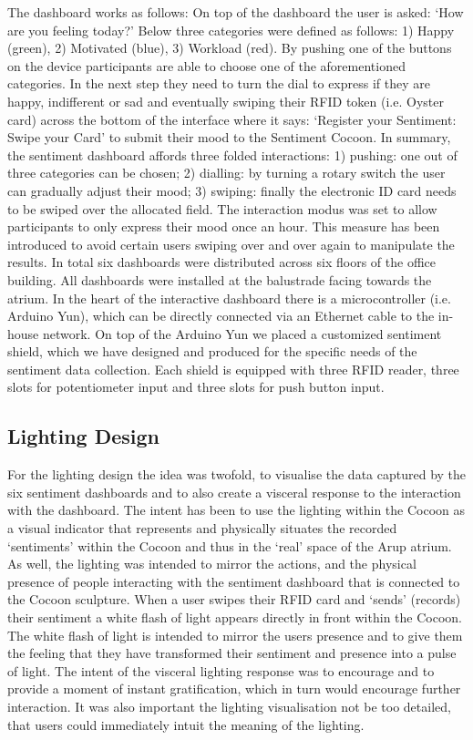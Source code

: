 The dashboard works as follows: On top of the dashboard the user is asked: ‘How are you feeling today?’ Below three categories were defined as follows: 1) Happy (green), 2) Motivated (blue), 3) Workload (red). By pushing one of the buttons on the device participants are able to choose one of the aforementioned categories. In the next step they need to turn the dial to express if they are happy, indifferent or sad and eventually swiping their RFID token (i.e. Oyster card) across the bottom of the interface where it says: ‘Register your Sentiment: Swipe your Card’ to submit their mood to the Sentiment Cocoon. In summary, the sentiment dashboard affords three folded interactions: 1) pushing: one out of three categories can be chosen; 2) dialling: by turning a rotary switch the user can gradually adjust their mood; 3) swiping: finally the electronic ID card needs to be swiped over the allocated field.
The interaction modus was set to allow participants to only express their mood once an hour. This measure has been introduced to avoid certain users swiping over and over again to manipulate the results. 
In total six dashboards were distributed across six floors of the office building. All dashboards were installed at the balustrade facing towards the atrium. 
In the heart of the interactive dashboard there is a microcontroller (i.e. Arduino Yun), which can be directly connected via an Ethernet cable to the in-house network. On top of the Arduino Yun we placed a customized sentiment shield, which we have designed and produced for the specific needs of the sentiment data collection. Each shield is equipped with three RFID reader, three slots for potentiometer input and three slots for push button input.

\subsection{Lighting Design}

For the lighting design the idea was twofold, to visualise the data captured by the six sentiment dashboards and to also create a visceral response to the interaction with the dashboard. The intent has been to use the lighting within the Cocoon as a visual indicator that represents and physically situates the recorded ‘sentiments’ within the Cocoon and thus in the ‘real’ space of the Arup atrium. As well, the lighting was intended to mirror the actions, and the physical presence of people interacting with the sentiment dashboard that is connected to the Cocoon sculpture. When a user swipes their RFID card and ‘sends’ (records) their sentiment a white flash of light appears directly in front within the Cocoon. The white flash of light is intended to mirror the users presence and to give them the feeling that they have transformed their sentiment and presence into a pulse of light. The intent of the visceral lighting response was to encourage and to provide a moment of instant gratification, which in turn would encourage further interaction. It was also important the lighting visualisation not be too detailed, that users could immediately intuit the meaning of the lighting.

